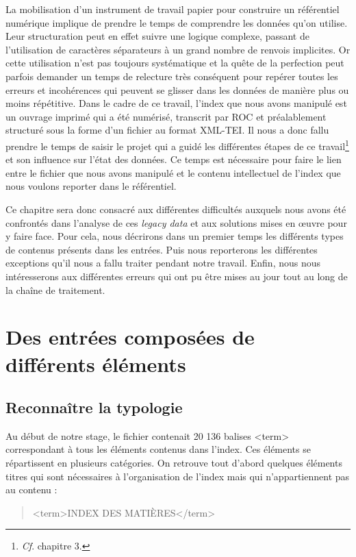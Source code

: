 \documentclass[a4paper,12pt,twoside]{book}
\begin{document}
	La mobilisation d'un instrument de travail papier pour construire un référentiel numérique implique de prendre le temps de comprendre les données qu'on utilise. Leur structuration peut en effet suivre une logique complexe, passant de l'utilisation de caractères séparateurs à un grand nombre de renvois implicites. Or cette utilisation n'est pas toujours systématique et la quête de la perfection peut parfois demander un temps de relecture très conséquent pour repérer toutes les erreurs et incohérences qui peuvent se glisser dans les données de manière plus ou moins répétitive. Dans le cadre de ce travail, l'index que nous avons manipulé est un ouvrage imprimé qui a été numérisé, transcrit par ROC et préalablement structuré sous la forme d'un fichier au format XML-TEI. Il nous a donc fallu prendre le temps de saisir le projet qui a guidé les différentes étapes de ce travail\footnote{\textit{Cf}. chapitre 3.} et son influence sur l'état des données. Ce temps est nécessaire pour faire le lien entre le fichier que nous avons manipulé et le contenu intellectuel de l'index que nous voulons reporter dans le référentiel.
	
	Ce chapitre sera donc consacré aux différentes difficultés auxquels nous avons été confrontés dans l'analyse de ces \textit{legacy data} et aux solutions mises en œuvre pour y faire face. Pour cela, nous décrirons dans un premier temps les différents types de contenus présents dans les entrées. Puis nous reporterons les différentes exceptions qu'il nous a fallu traiter pendant notre travail. Enfin, nous nous intéresserons aux différentes erreurs qui ont pu être mises au jour tout au long de la chaîne de traitement.
	
	\section{Des entrées composées de différents éléments}
	
	\subsection{Reconnaître la typologie}
	
	Au début de notre stage, le fichier contenait 20 136 balises <term> correspondant à tous les éléments contenus dans l'index. Ces éléments se répartissent en plusieurs catégories. On retrouve tout d'abord quelques éléments titres qui sont nécessaires à l'organisation de l'index mais qui n'appartiennent pas au contenu :
	
	\begin{quotation}
		<term>INDEX DES MATIÈRES</term>
	\end{quotation}
\end{document}
